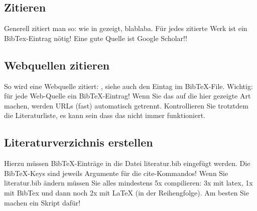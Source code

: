 \documentclass[12pt,oneside]{article}
\begin{document}
\subsection{Zitieren}\label{sec:zitate}
Generell zitiert man so: wie in \cite{clemen1989combining} gezeigt, blablaba. Für jedes zitierte Werk ist ein BibTex-Eintrag nötig! Eine gute Quelle ist Google Scholar!!

\subsection{Webquellen zitieren}\label{sec:webquellen}
So wird eine Webquelle zitiert: \cite{shiny1}, siehe auch den Eintag im BibTeX-File.
Wichtig: für jede Web-Quelle ein BibTeX-Eintrag! Wenn Sie das auf die hier gezeigte Art machen, werden URLs (fast) automatisch getrennt. Kontrollieren Sie trotztdem die Literaturliste, es kann sein dass das nicht immer funktioniert.

\subsection{Literaturverzichnis erstellen}
Hierzu müssen BibTeX-Einträge in die Datei literatur.bib eingefügt werden. Die BibTeX-Keys sind jeweils Argumente für die cite-Kommandos! Wenn Sie literatur.bib ändern müssen Sie alles mindestens 5x compilieren: 3x mit latex, 1x mit BibTex und dann noch 2x mit LaTeX (in der Reihengfolge). Am besten Sie machen ein Skript dafür!


\clearpage



\appendix
\end{document}
